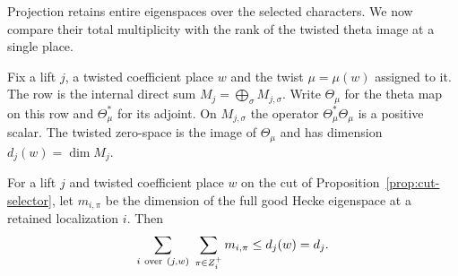 Projection retains entire eigenspaces over the selected characters. We now compare their total multiplicity with the rank of the twisted theta image at a single place.

Fix a lift \(j\), a twisted coefficient place \(w\) and the
twist \(\mu=\mu(w)\) assigned to it. The row is the internal
direct sum \(M_j=\bigoplus_\sigma M_{j,\sigma}\).
Write \(\Theta_\mu\) for the theta map on this row and
\(\Theta_\mu^*\) for its adjoint. On \(M_{j,\sigma}\)
the operator \(\Theta_\mu^*\Theta_\mu\) is a positive
scalar. The twisted zero-space is the image of \(\Theta_\mu\)
and has dimension \(d_j(w)=\dim M_j\).

\begin{proposition}
\label{prop:cut-multiplicity}
For a lift \(j\) and twisted coefficient place \(w\) on the cut
of Proposition~\ref{prop:cut-selector}, let
\(m_{i,\pi}\) be the dimension of the full good Hecke
eigenspace at a retained localization \(i\). Then
\begin{equation}\label{eq:retained-multiplicity}
 \sum_{i\ {\rm over}\ (j,w)}\;\sum_{\pi\in Z_i^+} m_{i,\pi}
             \le d_j(w)=d_j .
\end{equation}
\end{proposition}

